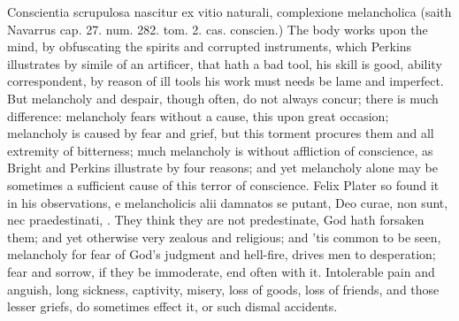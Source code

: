 {Conscientia scrupulosa nascitur ex vitio naturali, complexione
melancholica (saith Navarrus cap. 27. num. 282. tom. 2. cas. conscien.)
The body works upon the mind, by obfuscating the spirits and corrupted
instruments, which Perkins illustrates by simile of an artificer,
that hath a bad tool, his skill is good, ability correspondent, by
reason of ill tools his work must needs be lame and imperfect. But
melancholy and despair, though often, do not always concur; there is
much difference: melancholy fears without a cause, this upon great
occasion; melancholy is caused by fear and grief, but this torment
procures them and all extremity of bitterness; much melancholy is
without affliction of conscience, as Bright and Perkins
illustrate by four reasons; and yet melancholy alone may be sometimes a
sufficient cause of this terror of conscience. Felix Plater so
found it in his observations, e melancholicis alii damnatos se putant,
Deo curae, non sunt, nec praedestinati, \etc{}. They think they are not
predestinate, God hath forsaken them; and yet otherwise very zealous
and religious; and 'tis common to be seen, melancholy for fear of God's
judgment and hell-fire, drives men to desperation; fear and sorrow, if
they be immoderate, end often with it. Intolerable pain and anguish,
long sickness, captivity, misery, loss of goods, loss of friends, and
those lesser griefs, do sometimes effect it, or such dismal accidents.

}
